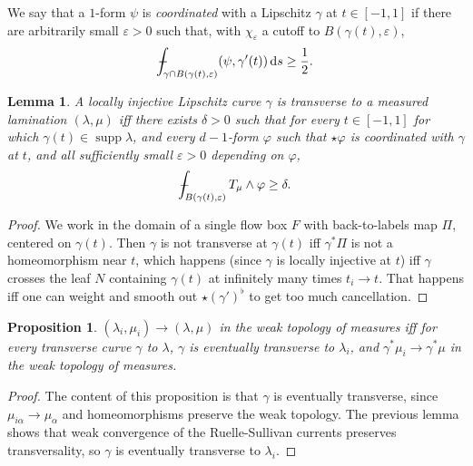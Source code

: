 \documentclass[reqno,10pt]{amsart}
\newcommand*\dif{\mathop{}\!\mathrm{d}}
\DeclareMathOperator{\supp}{supp}
\newcommand{\dfn}[1]{\emph{#1}\index{#1}}
\newtheorem{lemma}[theorem]{Lemma}
\newtheorem{proposition}[theorem]{Proposition}
\theoremstyle{definition}
\numberwithin{equation}{section}
\def\Xint#1{\mathchoice
{\XXint\displaystyle\textstyle{#1}}%
{\XXint\textstyle\scriptstyle{#1}}%
{\XXint\scriptstyle\scriptscriptstyle{#1}}%
{\XXint\scriptscriptstyle\scriptscriptstyle{#1}}%
\!\int}
\def\XXint#1#2#3{{\setbox0=\hbox{$#1{#2#3}{\int}$ }
\vcenter{\hbox{$#2#3$ }}\kern-.6\wd0}}
\def\dashint{\Xint-}
\begin{document}
We say that a $1$-form $\psi$ is \dfn{coordinated} with a Lipschitz $\gamma$ at $t \in [-1, 1]$ if there are arbitrarily small $\varepsilon > 0$ such that, with $\chi_\varepsilon$ a cutoff to $B(\gamma(t), \varepsilon)$, 
$$\dashint_{\gamma \cap B(\gamma(t), \varepsilon)} (\psi, \gamma'(t)) \dif s \geq \frac{1}{2}.$$ 

\begin{lemma}
A locally injective Lipschitz curve $\gamma$ is transverse to a measured lamination $(\lambda, \mu)$ iff there exists $\delta > 0$ such that for every $t \in [-1, 1]$ for which $\gamma(t) \in \supp \lambda$, and every $d-1$-form $\varphi$ such that $\star \varphi$ is coordinated with $\gamma$ at $t$, and all sufficiently small $\varepsilon > 0$ depending on $\varphi$,
$$\dashint_{B(\gamma(t), \varepsilon)} T_\mu \wedge \varphi \geq \delta.$$
\end{lemma}
\begin{proof}
We work in the domain of a single flow box $F$ with back-to-labels map $\Pi$, centered on $\gamma(t)$.
Then $\gamma$ is not transverse at $\gamma(t)$ iff $\gamma^* \Pi$ is not a homeomorphism near $t$, which happens (since $\gamma$ is locally injective at $t$) iff $\gamma$ crosses the leaf $N$ containing $\gamma(t)$ at infinitely many times $t_i \to t$.
That happens iff one can weight and smooth out $\star (\gamma')^\flat$ to get too much cancellation.
\end{proof}

\begin{proposition}\label{measured implies transversality}
$(\lambda_i, \mu_i) \to (\lambda, \mu)$ in the weak topology of measures iff for every transverse curve $\gamma$ to $\lambda$, $\gamma$ is eventually transverse to $\lambda_i$, and $\gamma^* \mu_i \to \gamma^* \mu$ in the weak topology of measures.
\end{proposition}
\begin{proof}
The content of this proposition is that $\gamma$ is eventually transverse, since $\mu_{i\alpha} \to \mu_\alpha$ and homeomorphisms preserve the weak topology.
The previous lemma shows that weak convergence of the Ruelle-Sullivan currents preserves transversality, so $\gamma$ is eventually transverse to $\lambda_i$.
\end{proof}
\end{document}

